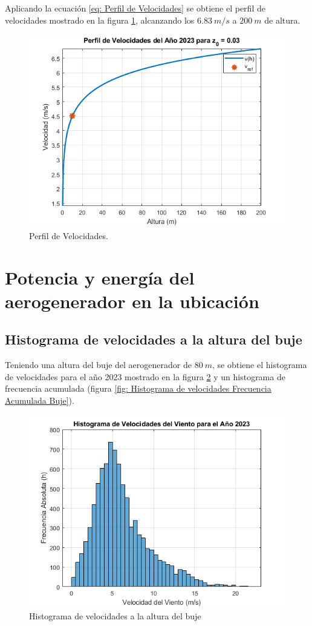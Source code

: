 \documentclass{IEEEtran}
\begin{document}
Aplicando la ecuación \ref{eq: Perfil de Velocidades} se obtiene el perfil de velocidades mostrado en la figura \ref{fig: Perfil de Velocidades}, alcanzando los $6.83\ m/s$ a $200\ m$ de altura.

\begin{figure}[h]
    \centering
    \includegraphics[width = 0.5 \textwidth]{Imagenes/Perfil de Velocidades.png}
    \caption{Perfil de Velocidades.}
    \label{fig: Perfil de Velocidades}
\end{figure}

\section{Potencia y energía del aerogenerador en la ubicación}


\subsection{Histograma de velocidades a la altura del buje}


Teniendo una altura del buje del aerogenerador de $80\ m$, se obtiene el histograma de velocidades para el año 2023 mostrado en la figura \ref{fig: Histograma de velocidades Buje} y un histograma de frecuencia acumulada (figura \ref{fig: Histograma de velocidades Frecuencia Acumulada Buje}).

\begin{figure}[h]
    \centering
    \includegraphics[width = 0.5 \textwidth]{Imagenes/Histograma de Velocidades Buje.png}
    \caption{Histograma de velocidades a la altura del buje}
    \label{fig: Histograma de velocidades Buje}
\end{figure}
\end{document}
